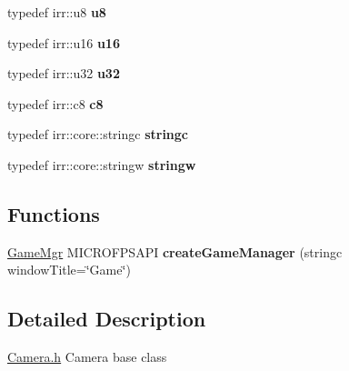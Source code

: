 \begin{DoxyCompactItemize}
\item 
\hypertarget{namespace_micro_f_p_s_a4638d9e2766529b56f1019e53de94737}{
typedef irr::u8 {\bfseries u8}}
\label{d4/d58/namespace_micro_f_p_s_a4638d9e2766529b56f1019e53de94737}

\item 
\hypertarget{namespace_micro_f_p_s_a58a3ffe256a48dc7e9dd781ec8800688}{
typedef irr::u16 {\bfseries u16}}
\label{d4/d58/namespace_micro_f_p_s_a58a3ffe256a48dc7e9dd781ec8800688}

\item 
\hypertarget{namespace_micro_f_p_s_a0fae570dac75e1b64402df4d0030bc44}{
typedef irr::u32 {\bfseries u32}}
\label{d4/d58/namespace_micro_f_p_s_a0fae570dac75e1b64402df4d0030bc44}

\item 
\hypertarget{namespace_micro_f_p_s_a867210ea6563092a97d47423aa556a09}{
typedef irr::c8 {\bfseries c8}}
\label{d4/d58/namespace_micro_f_p_s_a867210ea6563092a97d47423aa556a09}

\item 
\hypertarget{namespace_micro_f_p_s_a98450d7ec50479936a90607a349d47dc}{
typedef irr::core::stringc {\bfseries stringc}}
\label{d4/d58/namespace_micro_f_p_s_a98450d7ec50479936a90607a349d47dc}

\item 
\hypertarget{namespace_micro_f_p_s_aedc651829eb189979c25d6158bdcacef}{
typedef irr::core::stringw {\bfseries stringw}}
\label{d4/d58/namespace_micro_f_p_s_aedc651829eb189979c25d6158bdcacef}

\end{DoxyCompactItemize}
\subsection*{Functions}
\begin{DoxyCompactItemize}
\item 
\hypertarget{namespace_micro_f_p_s_a9f8feb39d08d3dfe5ad02204d3bacc5f}{
\hyperlink{class_micro_f_p_s_1_1_game_manager}{GameMgr} MICROFPSAPI {\bfseries createGameManager} (stringc windowTitle=\char`\"{}Game\char`\"{})}
\label{d4/d58/namespace_micro_f_p_s_a9f8feb39d08d3dfe5ad02204d3bacc5f}

\end{DoxyCompactItemize}


\subsection{Detailed Description}
\hyperlink{_camera_8h_source}{Camera.h} Camera base class

